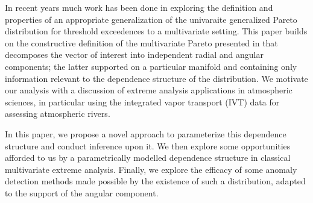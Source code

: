 
In recent years much work has been done in exploring the definition and properties of an appropriate
  generalization of the univaraite generalized Pareto distribution for threshold exceedences to a
  multivariate setting.  This paper builds on the constructive definition of the multivariate Pareto
  presented in \cite{ferreira2014} that decomposes the vector of interest into independent radial and
  angular components; the latter supported on a particular manifold and containing only information
  relevant to the dependence structure of the distribution.  We motivate our analysis with a discussion
  of extreme analysis applications in atmospheric sciences, in particular using the integrated vapor
  transport (IVT) data for assessing atmospheric rivers.

In this paper, we propose a novel approach to parameterize this dependence structure and conduct
  inference upon it.  We then explore some opportunities afforded to us by a parametrically modelled
  dependence structure in classical multivariate extreme analysis.  Finally, we explore the efficacy
  of some anomaly detection methods made possible by the existence of such a distribution, adapted
  to the support of the angular component.

